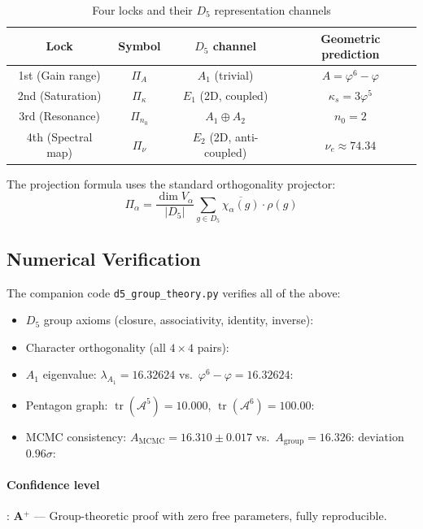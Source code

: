 \documentclass[12pt,a4paper,twocolumn]{article}
\renewcommand{\phi}{\varphi}
\begin{document}
\begin{table}[H]
\centering
\caption{Four locks and their $D_5$ representation channels}
\label{tab:four_locks_d5}
\begin{tabular}{c|c|c|c}
\hline
Lock & Symbol & $D_5$ channel & Geometric prediction \\
\hline
1st (Gain range) & $\Pi_A$ & $A_1$ (trivial) & $A = \phi^6 - \phi$ \\
2nd (Saturation) & $\Pi_\kappa$ & $E_1$ (2D, coupled) & $\kappa_s = 3\phi^5$ \\
3rd (Resonance) & $\Pi_{n_0}$ & $A_1 \oplus A_2$ & $n_0 = 2$ \\
4th (Spectral map) & $\Pi_\nu$ & $E_2$ (2D, anti-coupled) & $\nu_e \approx 74.34$ \\
\hline
\end{tabular}
\end{table}

The projection formula uses the standard orthogonality projector:
\[
\Pi_\alpha = \frac{\dim V_\alpha}{|D_5|} \sum_{g \in D_5} \overline{\chi_\alpha(g)} \cdot \rho(g)
\]

\subsection{Numerical Verification}
The companion code \texttt{d5\_group\_theory.py} verifies all of the above:
\begin{itemize}
\item $D_5$ group axioms (closure, associativity, identity, inverse): \checkmark
\item Character orthogonality (all $4 \times 4$ pairs): \checkmark
\item $A_1$ eigenvalue: $\lambda_{A_1} = 16.32624$ vs.\ $\phi^6 - \phi = 16.32624$: \checkmark
\item Pentagon graph: $\operatorname{tr}(\mathcal{A}^5) = 10.000$, $\operatorname{tr}(\mathcal{A}^6) = 100.00$: \checkmark
\item MCMC consistency: $A_{\mathrm{MCMC}} = 16.310 \pm 0.017$ vs.\ $A_{\mathrm{group}} = 16.326$: deviation $0.96\sigma$: \checkmark
\end{itemize}

\paragraph{Confidence level}: \textbf{A$^+$} --- Group-theoretic proof with zero free parameters, fully reproducible.


\end{document}
